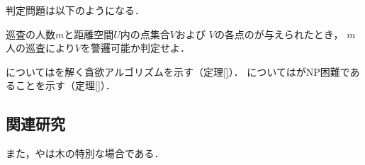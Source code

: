 判定問題は以下のようになる．

\begin{timeSpecifiedCooperativePatrollingProblemDecision}
  巡査の人数$m$と距離空間$U$内の点集合$V$および
  $V$の各点の{\exactidletime}が与えられたとき，
  $m$人の巡査により$V$を警邏可能か判定せよ．
\end{timeSpecifiedCooperativePatrollingProblemDecision}


{\graphLine}については{\timeSpecifiedPatProbDecision}を解く貪欲アルゴリズムを示す（定理\ref{}）．
{\graphUnit}については{\timeSpecifiedPatProbDecision}がNP困難であることを示す（定理\ref{}）．




\subsection*{関連研究}



また，{\graphLine}や{\graphStar}は木の特別な場合である．
